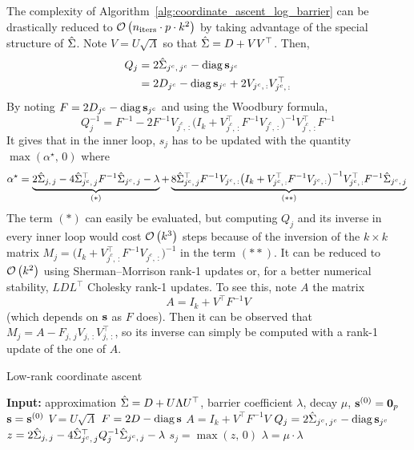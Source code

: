 The complexity of Algorithm~\ref{alg:coordinate_ascent_log_barrier} can be drastically reduced
to $\mathcal{O}\left( n_\text{iters} \cdot p \cdot k^2 \right)$
by taking advantage of the special structure of $\hat{\Sigma}$.
Note $V = U \sqrt{\Lambda}$ so that $\hat{\Sigma} = D + VV^\top$.
Then,
\begin{align*}
    Q_j &= 2\hat{\Sigma}_{j^c,\, j^c} - \operatorname*{diag}\mathbf{s}_{j^c}\\
    &= 2D_{j^c} - \operatorname*{diag}\mathbf{s}_{j^c} + 2V_{j^c,\, :}V_{j^c,\, :}^\top
\end{align*}
By noting $F = 2D_{j^c} - \operatorname*{diag}\mathbf{s}_{j^c}$ and using the Woodbury formula,
\begin{equation*}
    Q_j^{-1} =
        F^{-1} - 2F^{-1}V_{j^c,\, :}
            \big( I_k + V_{j^c,\, :}^\top F^{-1} V_{j^c,\, :} \big)^{-1}
                V_{j^c,\, :}^\top F^{-1}
\end{equation*}
It gives that in the inner loop, $s_j$ has to be updated with the quantity
$\max\left( \alpha^\star,\, 0 \right)$ where
\begin{equation*}
    \alpha^\star =
        \underbrace{
            2\hat{\Sigma}_{j,\, j}
            - 4\hat{\Sigma}_{j^c,\, j}^\top F^{-1} \hat{\Sigma}_{j^c,\, j}
            - \lambda
        }_\text{$(*)$}
        + \underbrace{
            8\hat{\Sigma}_{j^c,\, j}^\top F^{-1} V_{j^c,\, :}
            \big( I_k + V_{j^c,\, :}^\top F^{-1} V_{j^c,\, :} \big)^{-1}
            V_{j^c,\, :}^\top F^{-1}\hat{\Sigma}_{j^c,\, j}
        }_\text{$(**)$}\\
\end{equation*}
The term $(*)$ can easily be evaluated,
but computing $Q_j$ and its inverse in every inner loop would cost $\mathcal{O}\left( k^3 \right)$ steps
because of the inversion of the $k \times k$ matrix
$M_j = \big( I_k + V_{j^c,\, :}^\top F^{-1} V_{j^c,\, :} \big)^{-1}$
in the term $(**)$.
It can be reduced to $\mathcal{O}\left( k^2 \right)$ using Sherman–Morrison rank-1 updates or,
for a better numerical stability,
$LDL^\top$ Cholesky rank-1 updates.
To see this, note $A$ the matrix
\begin{equation*}
    A = I_k + V^\top F^{-1} V
\end{equation*}
(which depends on $\mathbf{s}$ as $F$ does).
Then it can be observed that $M_j = A - F_{j,\, j} V_{j,\, :}V_{j,\, :}^\top$,
so its inverse can simply be computed with a rank-1 update of the one of $A$.
\begin{algorithm}
    \caption{Low-rank coordinate ascent}\label{alg:low_rank_coordinate_ascent}
    \begin{algorithmic}[1]
        \State \textbf{Input:} approximation $\hat{\Sigma} = D + U \Lambda U^\top$, barrier coefficient $\lambda$,
            decay $\mu$, $\mathbf{s}^{(0)} = \mathbf{0}_p$
        \State $\mathbf{s} = \mathbf{s}^{(0)}$
        \State $V = U \sqrt{\Lambda}$
        \State $F = 2D - \operatorname*{diag}\mathbf{s}$
        \State $A = I_k + V^\top F^{-1} V$
        \Repeat
        \State $Q_j = 2\hat{\Sigma}_{j^c,\, j^c} - \operatorname*{diag}\mathbf{s}_{j^c}$
        \State $z = 2\hat{\Sigma}_{j,\, j} - 4\hat{\Sigma}_{j^c,\, j}^\top Q_j^{-1} \hat{\Sigma}_{j^c,\, j} - \lambda$
        \State $s_j = \max\left( z,\, 0 \right)$
        \EndFor
        \State $\lambda = \mu \cdot \lambda$
    \end{algorithmic}
\end{algorithm}

